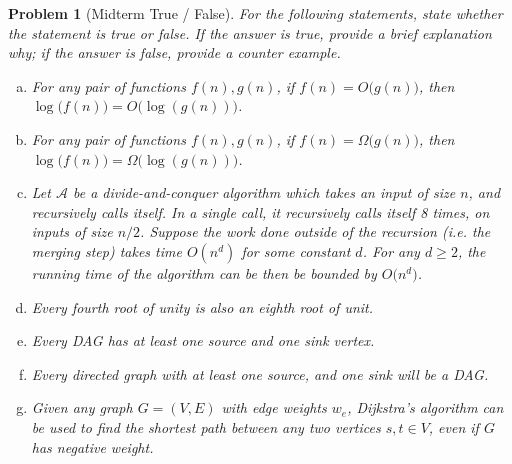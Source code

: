\documentclass[10pt]{article}
\newtheorem{problem}{\sc\color{cit}Problem}
\begin{document}
\newpage
\begin{problem}[Midterm True / False] 
For the following statements, state whether the statement is true or false. If the answer is true, provide a brief explanation why; if the answer is false, provide a counter example.
\begin{enumerate}[(a)]
\item For any pair of functions $f(n), g(n)$, if $f(n) = O\big( g(n) \big)$, then $\log\big( f(n) \big) = O\big( \log ( g(n)) \big)$.

\item For any pair of functions $f(n), g(n)$, if $f(n) = \Omega\big( g(n) \big)$, then $\log\big( f(n) \big) = \Omega\big( \log( g(n)) \big)$.

\item Let $\mathcal{A}$ be a divide-and-conquer algorithm which takes an input of size $n$, and recursively calls itself. In a single call, it recursively calls itself 8 times, on inputs of size $n / 2$. Suppose the work done outside of the recursion (i.e. the merging step) takes time $O(n^d)$ for some constant $d$. For any $d \geq 2$, the running time of the algorithm can be then be bounded by $O\big( n^d \big)$.

\item Every fourth root of unity is also an eighth root of unit.

\item Every DAG has at least one source and one sink vertex.

\item Every directed graph with at least one source, and one sink will be a DAG.

\item Given any graph $G = (V, E)$ with edge weights $w_e$, Dijkstra's algorithm can be used to find the shortest path between any two vertices $s, t \in V$, even if $G$ has negative weight.
\end{enumerate}
    
\end{problem}

\begin{solution}
    
\end{solution}

\end{document}
